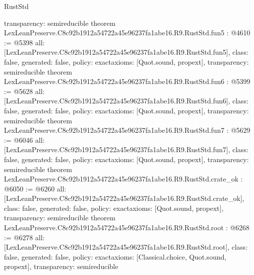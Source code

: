 \begin{lexlean}{RustStd}
\begin{coremodule}
{  transparency: semireducible
}
theorem LexLeanPreserve.C8c92b1912a54722a45e96237fa1abe16.R9.RustStd.fun5 : @4610 := @5398 {
  all: [LexLeanPreserve.C8c92b1912a54722a45e96237fa1abe16.R9.RustStd.fun5],
  class: false,
  generated: false,
  policy: exact{axioms: [Quot.sound, propext]},
  transparency: semireducible
}
theorem LexLeanPreserve.C8c92b1912a54722a45e96237fa1abe16.R9.RustStd.fun6 : @5399 := @5628 {
  all: [LexLeanPreserve.C8c92b1912a54722a45e96237fa1abe16.R9.RustStd.fun6],
  class: false,
  generated: false,
  policy: exact{axioms: [Quot.sound, propext]},
  transparency: semireducible
}
theorem LexLeanPreserve.C8c92b1912a54722a45e96237fa1abe16.R9.RustStd.fun7 : @5629 := @6046 {
  all: [LexLeanPreserve.C8c92b1912a54722a45e96237fa1abe16.R9.RustStd.fun7],
  class: false,
  generated: false,
  policy: exact{axioms: [Quot.sound, propext]},
  transparency: semireducible
}
theorem LexLeanPreserve.C8c92b1912a54722a45e96237fa1abe16.R9.RustStd.crate_ok : @6050 := @6260 {
  all: [LexLeanPreserve.C8c92b1912a54722a45e96237fa1abe16.R9.RustStd.crate_ok],
  class: false,
  generated: false,
  policy: exact{axioms: [Quot.sound, propext]},
  transparency: semireducible
}
theorem LexLeanPreserve.C8c92b1912a54722a45e96237fa1abe16.R9.RustStd.root : @6268 := @6278 {
  all: [LexLeanPreserve.C8c92b1912a54722a45e96237fa1abe16.R9.RustStd.root],
  class: false,
  generated: false,
  policy: exact{axioms: [Classical.choice, Quot.sound, propext]},
  transparency: semireducible
}


\end{coremodule}
\end{lexlean}
